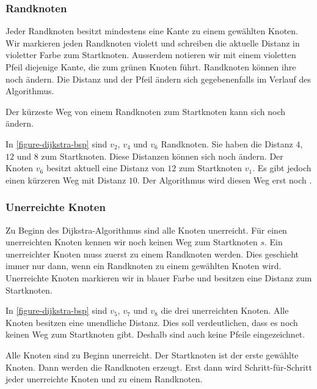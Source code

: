 \subsubsection{Randknoten}

Jeder Randknoten besitzt mindestens eine Kante zu einem gewählten Knoten. Wir markieren jeden Randknoten violett und schreiben die aktuelle Distanz in violetter Farbe zum Startknoten. Ausserdem notieren wir mit einem violetten Pfeil diejenige Kante, die zum grünen Knoten führt. Randknoten können ihre  noch ändern. Die Distanz und der Pfeil ändern sich gegebenenfalls im Verlauf des Algorithmus.

\begin{important}
	Der kürzeste Weg von einem Randknoten zum Startknoten kann sich noch ändern.
\end{important}

\begin{example}
	In \autoref{figure-dijkstra-bsp} sind $v_2$, $v_4$ und $v_6$ Randknoten. Sie haben die Distanz $4$, $12$ und $8$ zum Startknoten. Diese Distanzen können sich noch ändern. Der Knoten $v_6$ besitzt aktuell eine Distanz von $12$ zum Startknoten $v_1$. Es gibt jedoch einen kürzeren Weg mit Distanz $10$. Der Algorithmus wird diesen Weg erst noch .
\end{example}

\subsubsection{Unerreichte Knoten}

Zu Beginn des Dijkstra-Algorithmus sind alle Knoten unerreicht. Für einen unerreichten Knoten kennen wir noch keinen Weg zum Startknoten $s$. Ein unerreichter Knoten muss zuerst zu einem Randknoten werden. Dies geschieht immer nur dann, wenn ein Randknoten zu einem gewählten Knoten wird. Unerreichte Knoten markieren wir in blauer Farbe und besitzen eine  Distanz zum Startknoten.

\begin{example}
	In \autoref{figure-dijkstra-bsp} sind $v_5$, $v_7$ und $v_8$ die drei unerreichten Knoten. Alle Knoten besitzen eine unendliche Distanz. Dies soll verdeutlichen, dass es noch keinen Weg zum Startknoten gibt. Deshalb sind auch keine Pfeile eingezeichnet.
\end{example}

\begin{important}
	Alle Knoten sind zu Beginn unerreicht. Der Startknoten ist der erste gewählte Knoten. Dann werden die Randknoten erzeugt. Erst dann wird Schritt-für-Schritt jeder unerreichte Knoten  und zu einem Randknoten.
\end{important}

